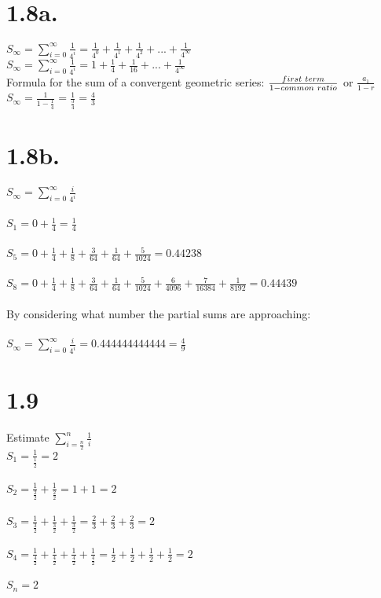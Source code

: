 \documentclass[12pt,letterpaper]{article}
\begin{document}
\section*{1.8a.}
$\displaystyle S_{\infty} = \sum_{i=0}^{\infty}\frac{1}{4^i} = \frac{1}{4^0} + \frac{1}{4^1} + \frac{1}{4^2} + ... + \frac{1}{4^{\infty}}$\\
$\displaystyle S_{\infty} = \sum_{i=0}^{\infty}\frac{1}{4^i} = 1 + \frac{1}{4} + \frac{1}{16} + ... + \frac{1}{4^{\infty}}$\\
Formula for the sum of a convergent geometric series: $\frac{first\hspace*{.1 cm}term}{1 - common\hspace*{.1 cm}ratio}$ or $\frac{a_{1}}{1 - r}$\\
$\displaystyle S_{\infty} = \frac{1}{1 - \frac{1}{4}} = \frac{1}{\frac{3}{4}} = \frac{4}{3}$
\section*{1.8b.}
$\displaystyle S_{\infty} = \sum_{i=0}^{\infty} \frac{i}{4^i}$\\\\
$S_{1} = 0 + \frac{1}{4} = \frac{1}{4}$\\\\
$S_{5} = 0 + \frac{1}{4} + \frac{1}{8} + \frac{3}{64} + \frac{1}{64} + \frac{5}{1024} = 0.44238$\\\\
$S_{8} = 0 + \frac{1}{4} + \frac{1}{8} + \frac{3}{64} + \frac{1}{64} + \frac{5}{1024} + \frac{6}{4096} + \frac{7}{16384} + \frac{1}{8192} = 0.44439$\\\\
By considering what number the partial sums are approaching:\\\\
$\displaystyle S_{\infty} = \sum_{i=0}^{\infty} \frac{i}{4^i} = 0.444444444444 = \frac{4}{9}$
\newpage
\section*{1.9}
Estimate $\displaystyle \sum_{i=\frac{n}{2}}^{n} \frac{1}{i}$\\
$\displaystyle S_{1} = \frac{1}{\frac{1}{2}} = 2$\\\\
$\displaystyle S_{2} = \frac{1}{\frac{2}{2}} + \frac{1}{\frac{2}{2}} = 1 + 1 = 2$\\\\
$\displaystyle S_{3} = \frac{1}{\frac{3}{2}} + \frac{1}{\frac{3}{2}} + \frac{1}{\frac{3}{2}} = \frac{2}{3} + \frac{2}{3} + \frac{2}{3} = 2$\\\\
$\displaystyle S_{4} = \frac{1}{\frac{4}{2}} + \frac{1}{\frac{4}{2}} + \frac{1}{\frac{4}{2}} + \frac{1}{\frac{4}{2}} = \frac{1}{2} + \frac{1}{2} + \frac{1}{2} + \frac{1}{2} = 2$\\\\
$\displaystyle S_{n} = 2$
\end{document}
